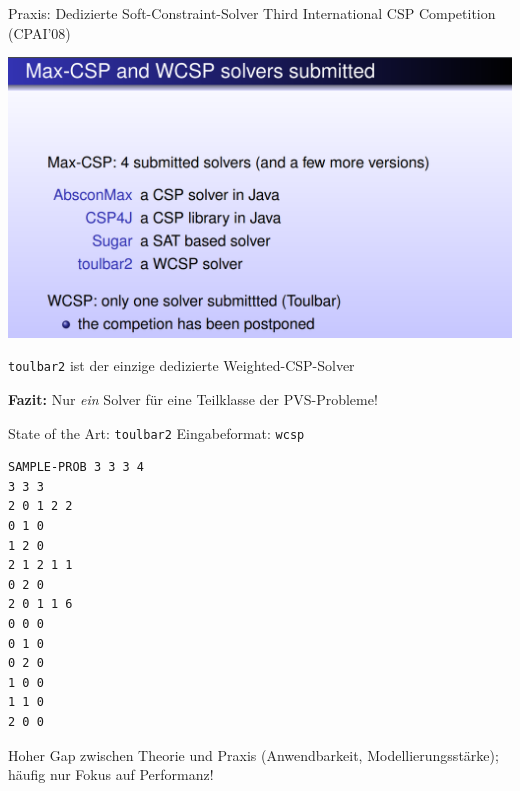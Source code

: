 
\begin{frame}{Praxis: Dedizierte Soft-Constraint-Solver}
Third International CSP Competition (CPAI’08)
\begin{center}
\includegraphics[width=.8\textwidth]{img/cpai08.png}
\end{center}
{ \color{isseorange} \texttt{toulbar2} ist der einzige dedizierte Weighted-CSP-Solver}

\textbf{Fazit:} Nur \emph{ein} Solver für eine Teilklasse der PVS-Probleme!
\end{frame}

\begin{frame}[fragile]{State of the Art: \texttt{toulbar2}}
Eingabeformat: \texttt{wcsp}

\vspace*{2ex}

\begin{verbatim}
SAMPLE-PROB 3 3 3 4
3 3 3
2 0 1 2 2
0 1 0 
1 2 0
2 1 2 1 1
0 2 0
2 0 1 1 6
0 0 0
0 1 0
0 2 0 
1 0 0 
1 1 0
2 0 0
\end{verbatim}
Hoher Gap zwischen Theorie und Praxis (Anwendbarkeit, Modellierungsstärke); häufig nur Fokus auf Performanz!
\end{frame}


